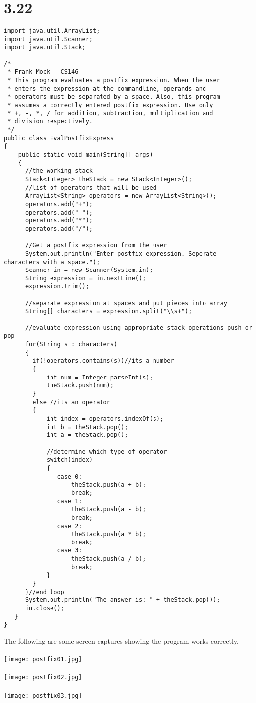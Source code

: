 \documentclass[12pt,letterpaper]{article}
\begin{document}
\section*{3.22}
\scriptsize
\begin{verbatim}
import java.util.ArrayList;
import java.util.Scanner;
import java.util.Stack;

/*
 * Frank Mock - CS146
 * This program evaluates a postfix expression. When the user
 * enters the expression at the commandline, operands and
 * operators must be separated by a space. Also, this program
 * assumes a correctly entered postfix expression. Use only
 * +, -, *, / for addition, subtraction, multiplication and
 * division respectively.
 */
public class EvalPostfixExpress
{
	public static void main(String[] args)
	{
      //the working stack
      Stack<Integer> theStack = new Stack<Integer>();
      //list of operators that will be used
      ArrayList<String> operators = new ArrayList<String>();
      operators.add("+");
      operators.add("-");
      operators.add("*");
      operators.add("/");
 		
      //Get a postfix expression from the user
      System.out.println("Enter postfix expression. Seperate characters with a space.");
      Scanner in = new Scanner(System.in);
      String expression = in.nextLine();
      expression.trim();
        
      //separate expression at spaces and put pieces into array
      String[] characters = expression.split("\\s+");
        
      //evaluate expression using appropriate stack operations push or pop
      for(String s : characters)
      {
      	if(!operators.contains(s))//its a number
        {
        	int num = Integer.parseInt(s);
        	theStack.push(num);
        }
        else //its an operator
        {
        	int index = operators.indexOf(s);
        	int b = theStack.pop();
        	int a = theStack.pop();
        		
        	//determine which type of operator
        	switch(index)
        	{
        	   case 0:
        		   theStack.push(a + b);
        		   break;
        	   case 1:
        		   theStack.push(a - b);
        		   break;
        	   case 2:
        		   theStack.push(a * b);
        		   break;
        	   case 3:
        		   theStack.push(a / b);
        		   break;
        	}
        }
      }//end loop
      System.out.println("The answer is: " + theStack.pop());
      in.close();
   }
}
\end{verbatim}
\small
The following are some screen captures showing the program works correctly.\\\\
\texttt{[image: postfix01.jpg]}\\\\
\texttt{[image: postfix02.jpg]}\\\\
\texttt{[image: postfix03.jpg]}\\
\newpage
\end{document}
